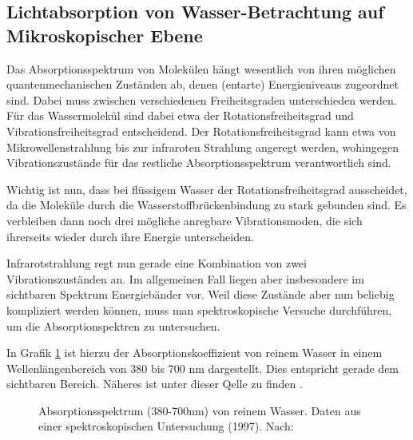 \documentclass[12pt,a4paper,titlepage,headinclude,bibtotoc]{scrartcl}
\numberwithin{equation}{subsection}
\begin{document}
\subsection{Lichtabsorption von Wasser-Betrachtung auf Mikroskopischer Ebene}
Das Absorptionsspektrum von Molekülen hängt wesentlich von ihren möglichen 
quantenmechanischen Zuständen ab, denen (entarte) Energieniveaus zugeordnet sind. Dabei muss zwischen verschiedenen Freiheitsgraden
unterschieden werden. Für das Wassermolekül sind dabei etwa der Rotationsfreiheitsgrad und Vibrationsfreiheitsgrad entscheidend.
Der Rotationsfreiheitsgrad kann etwa von Mikrowellenstrahlung bis zur infraroten Strahlung angeregt werden, wohingegen Vibrationszustände für das restliche Absorptionsspektrum verantwortlich sind.


Wichtig ist nun, dass bei flüssigem Wasser der Rotationsfreiheitsgrad ausscheidet, da die Moleküle durch die Wasserstoffbrückenbindung zu stark gebunden sind.
Es verbleiben dann noch drei mögliche anregbare Vibrationsmoden, die sich ihrerseits wieder durch ihre Energie unterscheiden.

Infrarotstrahlung regt nun gerade eine Kombination von zwei Vibrationszuständen an.
Im allgemeinen Fall liegen aber insbesondere im sichtbaren Spektrum Energiebänder vor.
Weil diese Zustände aber nun beliebig kompliziert werden können, muss man spektroskopische Versuche durchführen, um die Absorptionspektren zu untersuchen.

In Grafik \ref{fig:abs} ist hierzu der Absorptionskoeffizient von reinem Wasser in einem Wellenlängenbereich von 380 bis 700 nm dargestellt.
Dies entspricht gerade dem sichtbaren Bereich.
Näheres ist unter dieser Qelle zu finden \cite{abs}.

\begin{figure}[h]
	\centering
	
	\caption{Absorptionsspektrum (380-700nm) von reinem Wasser. Daten aus einer spektroskopischen Untersuchung (1997). Nach: \cite{speck}}
	\label{fig:abs}
\end{figure}
\end{document}
